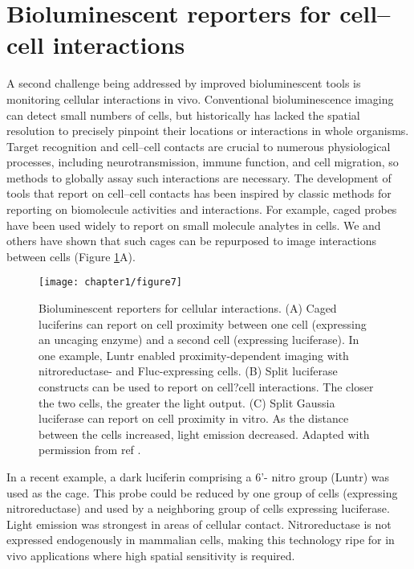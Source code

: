 \section{Bioluminescent reporters for cell--cell interactions}
A second challenge being addressed by improved bioluminescent
tools is monitoring cellular interactions in vivo.
Conventional bioluminescence imaging can detect small
numbers of cells, but historically has lacked the spatial
resolution to precisely pinpoint their locations or interactions
in whole organisms. Target recognition and cell--cell contacts
are crucial to numerous physiological processes, including
neurotransmission, immune function, and cell migration, so
methods to globally assay such interactions are necessary.
The development of tools that report on cell--cell contacts
has been inspired by classic methods for reporting on
biomolecule activities and interactions. For example, caged
probes have been used widely to report on small molecule
analytes in cells. We and others\cite{Lindberg:2013bw} have shown that such cages
can be repurposed to image interactions between cells (Figure
\ref{fig:cell_contact}A).

\begin{figure}[htbp]
\texttt{[image: chapter1/figure7]}
\centering
\caption[Bioluminescent reporters for cellular interactions.]{Bioluminescent reporters for cellular interactions. (A) Caged
luciferins can report on cell proximity between one cell (expressing an
uncaging enzyme) and a second cell (expressing luciferase). In one
example, Luntr enabled proximity-dependent imaging with nitroreductase-
and Fluc-expressing cells. (B) Split luciferase constructs can
be used to report on cell?cell interactions. The closer the two cells,
the greater the light output. (C) Split Gaussia luciferase can report on
cell proximity in vitro. As the distance between the cells increased,
light emission decreased. Adapted with permission from ref \cite{Jones:2015gg}.}
  \label{fig:cell_contact}
\end{figure}

In a recent example, a dark luciferin comprising a 6'-
nitro group (Luntr) was used as the cage.\cite{Porterfield:2015bj} This probe could
be reduced by one group of cells (expressing nitroreductase)
and used by a neighboring group of cells expressing luciferase.
Light emission was strongest in areas of cellular contact.
Nitroreductase is not expressed endogenously in mammalian
cells, making this technology ripe for in vivo applications where
high spatial sensitivity is required.

